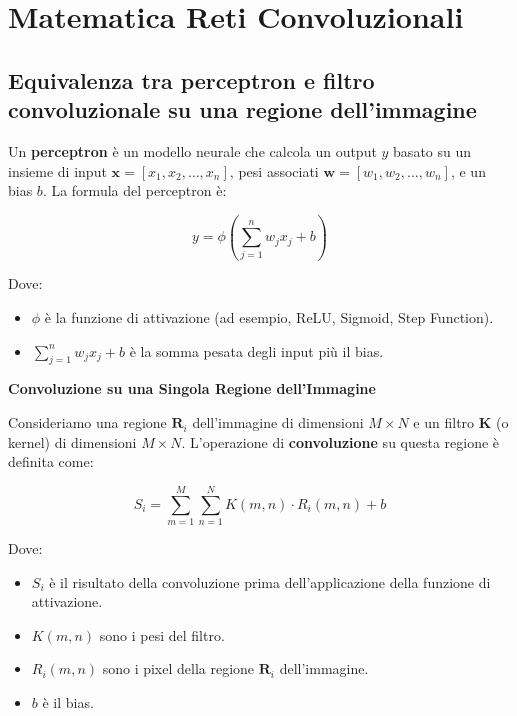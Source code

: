 \chapter{Matematica Reti Convoluzionali}
\label{appendix:B}

\section*{Equivalenza tra perceptron e filtro convoluzionale su una regione dell'immagine}

Un \textbf{perceptron} è un modello neurale che calcola un output \( y \) basato su un insieme di input \( \mathbf{x} = [x_1, x_2, \dots, x_n] \), pesi associati \( \mathbf{w} = [w_1, w_2, \dots, w_n] \), e un bias \( b \). La formula del perceptron è:

\[
y = \phi\left(\sum_{j=1}^{n} w_j x_j + b\right)
\]

Dove:
\begin{itemize}
    \item \( \phi \) è la funzione di attivazione (ad esempio, ReLU, Sigmoid, Step Function).
    \item \( \sum_{j=1}^{n} w_j x_j + b \) è la somma pesata degli input più il bias.
\end{itemize}

\noindent\textbf{Convoluzione su una Singola Regione dell'Immagine}

\vspace{0.5em} %

\noindent Consideriamo una regione \( \mathbf{R}_i \) dell'immagine di dimensioni \( M \times N \) e un filtro \( \mathbf{K} \) (o kernel) di dimensioni \( M \times N \). L'operazione di \textbf{convoluzione} su questa regione è definita come:

\[
S_i = \sum_{m=1}^{M} \sum_{n=1}^{N} K(m,n) \cdot R_i(m,n) + b
\]

Dove:
\begin{itemize}
    \item \( S_i \) è il risultato della convoluzione prima dell'applicazione della funzione di attivazione.
    \item \( K(m,n) \) sono i pesi del filtro.
    \item \( R_i(m,n) \) sono i pixel della regione \( \mathbf{R}_i \) dell'immagine.
    \item \( b \) è il bias.
\end{itemize}


